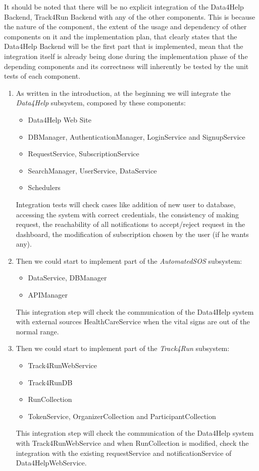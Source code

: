 \documentclass[a4paper, hidelinks, 12pt]{report}
\begin{document}
It should be noted that there will be no explicit integration of the Data4Help Backend, Track4Run Backend with any of the other components. This is because the nature of the component, the extent of the usage and dependency of other components on it and the implementation plan, that clearly states that the Data4Help Backend will be the first part that is implemented, mean that the integration itself is already being done during the implementation phase of the depending components and its correctness will inherently be tested by the unit tests of each component.
\begin{enumerate}
\item{} As written in the introduction, at the beginning we will integrate the \textit{Data4Help} subsystem, composed by these components:
\begin{itemize}
\item{} Data4Help Web Site
\item{} DBManager, AuthenticationManager, LoginService and SignupService
\item{} RequestService, SubscriptionService
\item{} SearchManager, UserService, DataService
\item{} Schedulers
\end{itemize}

Integration tests will check cases like addition of new user to database, accessing the system with correct credentials, the consistency of making request, the reachability of all notifications to accept/reject request in the dashboard, the modification of subscription chosen by the user (if he wants any).

\item{} Then we could start to implement part of the \textit{AutomatedSOS} subsystem:
\begin{itemize}
\item{} DataService, DBManager
\item{} APIManager 
\end{itemize}
This integration step will check the communication of the Data4Help system with external sources HealthCareService when the vital signs are out of the normal range.

\item{} Then we could start to implement part of the \textit{Track4Run} subsystem:
\begin{itemize}
\item{} Track4RunWebService
\item{} Track4RunDB 
\item{} RunCollection
\item{} TokenService, OrganizerCollection and ParticipantCollection
\end{itemize}
This integration step will check the communication of the Data4Help system with Track4RunWebService and when RunCollection is modified, check the integration with the existing requestService and notificationService of Data4HelpWebService.


\end{enumerate}
\end{document}
